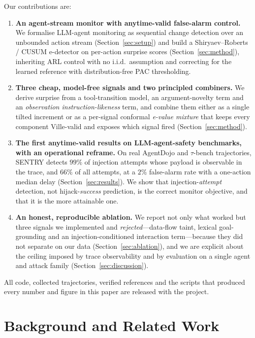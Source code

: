 \documentclass[pdflatex,sn-mathphys-num]{sn-jnl}%
\theoremstyle{thmstyleone}%
\theoremstyle{thmstyletwo}%
\theoremstyle{thmstylethree}%
\begin{document}
Our contributions are:
\begin{enumerate}
\item \textbf{An agent-stream monitor with anytime-valid false-alarm
control.} We formalise LLM-agent monitoring as sequential change detection
over an unbounded action stream (Section~\ref{sec:setup}) and build a
Shiryaev--Roberts / CUSUM e-detector on per-action surprise scores
(Section~\ref{sec:method}), inheriting ARL control with no i.i.d.\ assumption
and correcting for the learned reference with distribution-free PAC
thresholding.

\item \textbf{Three cheap, model-free signals and two principled combiners.}
We derive surprise from a tool-transition model, an argument-novelty term and
an \emph{observation instruction-likeness} term, and combine them either as a
single tilted increment or as a per-signal conformal \emph{e-value mixture}
that keeps every component Ville-valid and exposes which signal fired
(Section~\ref{sec:method}).

\item \textbf{The first anytime-valid results on LLM-agent-safety
benchmarks, with an operational reframe.} On real AgentDojo and
\(\tau\)-bench trajectories, SENTRY detects \(99\%\) of injection attempts
whose payload is observable in the trace, and \(66\%\) of all attempts, at a
\(2\%\) false-alarm rate with a one-action median delay
(Section~\ref{sec:results}). We show that injection-\emph{attempt} detection,
not hijack-\emph{success} prediction, is the correct monitor objective, and
that it is the more attainable one.

\item \textbf{An honest, reproducible ablation.} We report not only what
worked but three signals we implemented and \emph{rejected}---data-flow taint,
lexical goal-grounding and an injection-conditioned interaction term---because
they did not separate on our data (Section~\ref{sec:ablation}), and we are
explicit about the ceiling imposed by trace observability and by evaluation on
a single agent and attack family (Section~\ref{sec:discussion}).
\end{enumerate}

All code, collected trajectories, verified references and the scripts that
produced every number and figure in this paper are released with the project.

\section{Background and Related Work}\label{sec:related}
\end{document}
